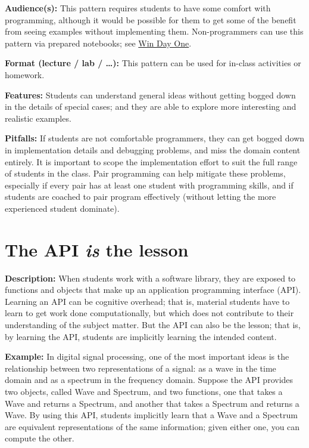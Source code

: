 \documentclass[]{book}
\begin{document}
\textbf{Audience(s):}
This pattern requires students to have some comfort with programming, although
it would be possible for them to get some of the benefit from seeing examples
without implementing them. Non-programmers can use this pattern via prepared
notebooks; see \protect\hyperlink{win-day-one}{Win Day One}.

\textbf{Format (lecture / lab / \ldots):}
This pattern can be used for in-class activities or homework.

\textbf{Features:}
Students can understand general ideas without getting bogged down in the
details of special cases; and they are able to explore more interesting and
realistic examples.

\textbf{Pitfalls:}
If students are not comfortable programmers, they can get bogged down in
implementation details and debugging problems, and miss the domain content
entirely. It is important to scope the implementation effort to suit the full
range of students in the class. Pair programming can help mitigate these
problems, especially if every pair has at least one student with programming
skills, and if students are coached to pair program effectively (without
letting the more experienced student dominate).

\hypertarget{the-api-is-the-lesson}{%
\section{\texorpdfstring{The API \emph{is} the lesson}{The API is the lesson}}\label{the-api-is-the-lesson}}

\textbf{Description:}
When students work with a software library, they are exposed to functions and
objects that make up an application programming interface (API). Learning an API
can be cognitive overhead; that is, material students have to learn to get work
done computationally, but which does not contribute to their understanding of
the subject matter. But the API can also be the lesson; that is, by learning the API,
students are implicitly learning the intended content.

\textbf{Example:}
In digital signal processing, one of the most important ideas is the relationship
between two representations of a signal: as a wave in the time domain and as a
spectrum in the frequency domain. Suppose the API provides two objects, called
Wave and Spectrum, and two functions, one that takes a Wave and returns a Spectrum,
and another that takes a Spectrum and returns a Wave. By using this API, students
implicitly learn that a Wave and a Spectrum are equivalent representations of the
same information; given either one, you can compute the other.
\end{document}
